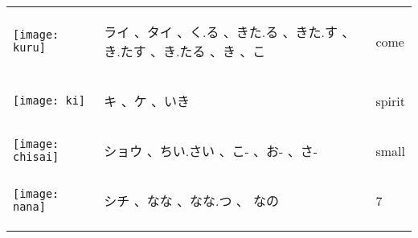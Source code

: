 \documentclass[a4paper,12pt]{extarticle}
\begin{document}
\begin{longtable}{|lp{6cm}p{4cm}|}
	\begin{minipage}{0.3\textwidth}
		\centerline{
			\texttt{[image: kuru]}
		}
	\end{minipage}
	                                   &
	\begin{CJK}{UTF8}{min} ライ 、タイ 、く.る 、きた.る 、きた.す 、き.たす 、き.たる 、き 、こ\end{CJK}
	                                   &
	come
	\\
	\begin{minipage}{0.3\textwidth}
		\centerline{
			\texttt{[image: ki]}
		}
	\end{minipage}
	                                   &
	\begin{CJK}{UTF8}{min} キ 、ケ 、いき\end{CJK}
	                                   &
	spirit
	\\
	\begin{minipage}{0.3\textwidth}
		\centerline{
			\texttt{[image: chisai]}
		}
	\end{minipage}
	                                   &
	\begin{CJK}{UTF8}{min} ショウ 、ちい.さい 、こ- 、お- 、さ-\end{CJK}
	                                   &
	small
	\\
	\begin{minipage}{0.3\textwidth}
		\centerline{
			\texttt{[image: nana]}
		}
	\end{minipage}
	                                   &
	\begin{CJK}{UTF8}{min} シチ 、なな 、なな.つ 、 なの\end{CJK}
	                                   &
	7
	\\
	\begin{minipage}{0.3\textwidth}

\end{minipage}
\end{longtable}
\end{document}
